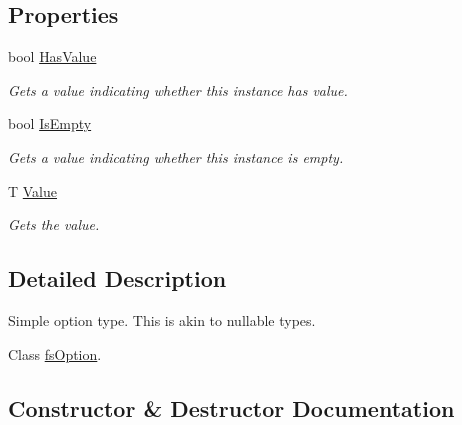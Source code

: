 \subsection*{Properties}
\begin{DoxyCompactItemize}
\item 
bool \hyperlink{struct_full_serializer_1_1_internal_1_1fs_option_a8271a12938fbe51299635f1998ee4659}{Has\+Value}
\begin{DoxyCompactList}\small\item\em Gets a value indicating whether this instance has value. \end{DoxyCompactList}\item 
bool \hyperlink{struct_full_serializer_1_1_internal_1_1fs_option_a751a53374e8c4a4b9727dbf4f1af3f9e}{Is\+Empty}
\begin{DoxyCompactList}\small\item\em Gets a value indicating whether this instance is empty. \end{DoxyCompactList}\item 
T \hyperlink{struct_full_serializer_1_1_internal_1_1fs_option_a7a047ed8e8e324add654a5c3620a97cd}{Value}
\begin{DoxyCompactList}\small\item\em Gets the value. \end{DoxyCompactList}\end{DoxyCompactItemize}


\subsection{Detailed Description}
Simple option type. This is akin to nullable types. 

Class \hyperlink{struct_full_serializer_1_1_internal_1_1fs_option}{fs\+Option}. 

\subsection{Constructor \& Destructor Documentation}
\mbox{\label{struct_full_serializer_1_1_internal_1_1fs_option_a2f7a2155bfce90df62b19977bf6c1e28}} 
